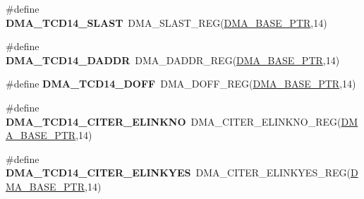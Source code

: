 \begin{DoxyCompactItemize}
\item 
\hypertarget{group___d_m_a___register___accessor___macros_gacf0b581267dc9a83559b9f89655b6919}{}\#define {\bfseries D\+M\+A\+\_\+\+T\+C\+D14\+\_\+\+S\+L\+A\+S\+T}~D\+M\+A\+\_\+\+S\+L\+A\+S\+T\+\_\+\+R\+E\+G(\hyperlink{group___d_m_a___peripheral_ga6997fbc1b1973e9f27170217a3bd6f22}{D\+M\+A\+\_\+\+B\+A\+S\+E\+\_\+\+P\+T\+R},14)\label{group___d_m_a___register___accessor___macros_gacf0b581267dc9a83559b9f89655b6919}

\item 
\hypertarget{group___d_m_a___register___accessor___macros_gad1b405904b78f29167e9ca3ec3f67c05}{}\#define {\bfseries D\+M\+A\+\_\+\+T\+C\+D14\+\_\+\+D\+A\+D\+D\+R}~D\+M\+A\+\_\+\+D\+A\+D\+D\+R\+\_\+\+R\+E\+G(\hyperlink{group___d_m_a___peripheral_ga6997fbc1b1973e9f27170217a3bd6f22}{D\+M\+A\+\_\+\+B\+A\+S\+E\+\_\+\+P\+T\+R},14)\label{group___d_m_a___register___accessor___macros_gad1b405904b78f29167e9ca3ec3f67c05}

\item 
\hypertarget{group___d_m_a___register___accessor___macros_ga65c1a27d4fcad9497503d722426ea346}{}\#define {\bfseries D\+M\+A\+\_\+\+T\+C\+D14\+\_\+\+D\+O\+F\+F}~D\+M\+A\+\_\+\+D\+O\+F\+F\+\_\+\+R\+E\+G(\hyperlink{group___d_m_a___peripheral_ga6997fbc1b1973e9f27170217a3bd6f22}{D\+M\+A\+\_\+\+B\+A\+S\+E\+\_\+\+P\+T\+R},14)\label{group___d_m_a___register___accessor___macros_ga65c1a27d4fcad9497503d722426ea346}

\item 
\hypertarget{group___d_m_a___register___accessor___macros_ga15a7687794a55a2cdfbbf2601b9775a5}{}\#define {\bfseries D\+M\+A\+\_\+\+T\+C\+D14\+\_\+\+C\+I\+T\+E\+R\+\_\+\+E\+L\+I\+N\+K\+N\+O}~D\+M\+A\+\_\+\+C\+I\+T\+E\+R\+\_\+\+E\+L\+I\+N\+K\+N\+O\+\_\+\+R\+E\+G(\hyperlink{group___d_m_a___peripheral_ga6997fbc1b1973e9f27170217a3bd6f22}{D\+M\+A\+\_\+\+B\+A\+S\+E\+\_\+\+P\+T\+R},14)\label{group___d_m_a___register___accessor___macros_ga15a7687794a55a2cdfbbf2601b9775a5}

\item 
\hypertarget{group___d_m_a___register___accessor___macros_gabb6dadb79352c6af3a1e860d6a010a15}{}\#define {\bfseries D\+M\+A\+\_\+\+T\+C\+D14\+\_\+\+C\+I\+T\+E\+R\+\_\+\+E\+L\+I\+N\+K\+Y\+E\+S}~D\+M\+A\+\_\+\+C\+I\+T\+E\+R\+\_\+\+E\+L\+I\+N\+K\+Y\+E\+S\+\_\+\+R\+E\+G(\hyperlink{group___d_m_a___peripheral_ga6997fbc1b1973e9f27170217a3bd6f22}{D\+M\+A\+\_\+\+B\+A\+S\+E\+\_\+\+P\+T\+R},14)\label{group___d_m_a___register___accessor___macros_gabb6dadb79352c6af3a1e860d6a010a15}


\end{DoxyCompactItemize}
